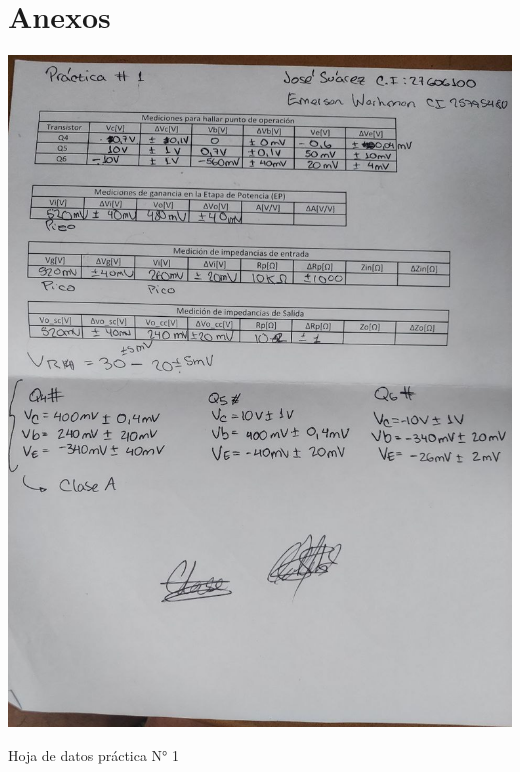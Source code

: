 \section{Anexos}

\begin{ilustracion}[ht]
    \centering
    \includegraphics[width=1.0\textwidth]{src/images/p1/p1-hoja-de-datos.jpg}
    \caption{Hoja de datos práctica N° 1}
    \label{ilus:hoja-de-datos-p1}
\end{ilustracion}


